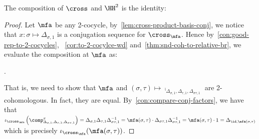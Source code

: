 \begin{lemma}\label{lem:relative-br-snd-inverse-1}
  The composition of $\cross$ and $\HH^{2}$ is the identity:
  \begin{center}
  \end{center}
  \leanok
\end{lemma}
\begin{proof}
  Let $\mfa$ be any 2-cocycle, by~\cref{lem:cross-product-basis-conj}, we notice that $x : \sigma \mapsto \Delta_{\sigma, 1}$ is a conjugation sequence for $\cross_{\mfa}$. Hence by~\cref{con:good-rep-to-2-cocycles}, ~\cref{cor:to-2-cocylce-wd} and~\cref{thm:snd-coh-to-relative-br}, we evaluate the composition at $\mfa$ as:
  \begin{center}
    .
  \end{center}
  That is, we need to show that $\mfa$ and $(\sigma, \tau) \mapsto \comp_{\Delta_{\sigma, 1}, \Delta_{\tau, 1}, \Delta_{\sigma\tau, 1}}$ are 2-cohomologous. In fact, they are equal.
  By~\cref{con:compare-conj-factors}, we have that $\iota_{\cross_{\mfa}}\left(\comp^{x}_{\Delta_{\sigma, 1}, \Delta_{\tau, 1}, \Delta_{\sigma\tau, 1}}\right) = \Delta_{\sigma, 1}\Delta_{\tau, 1}\Delta_{\sigma\tau, 1}^{-1} = \mfa(\sigma,\tau)\cdot \Delta_{\sigma\tau, 1}\Delta_{\sigma\tau, 1}^{-1} = \mfa(\sigma,\tau)\cdot 1 = \Delta_{\id,\mfa(\sigma,\tau)}$ which is precisely $\iota_{\cross_{\mfa}}(\mfa(\sigma,\tau))$.
\end{proof}

